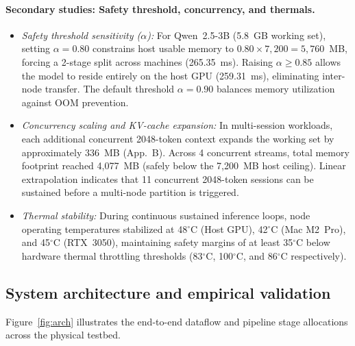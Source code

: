 \documentclass[10pt,a4paper]{article}
\begin{document}
\paragraph{Secondary studies: Safety threshold, concurrency, and thermals.}
\begin{itemize}[leftmargin=*]
\item \emph{Safety threshold sensitivity ($\alpha$):} For Qwen~2.5-3B (5.8~GB working set), setting $\alpha=0.80$ constrains host usable memory to $0.80 \times 7{,}200 = 5{,}760$~MB, forcing a 2-stage split across machines (265.35~ms). Raising $\alpha \ge 0.85$ allows the model to reside entirely on the host GPU (259.31~ms), eliminating inter-node transfer. The default threshold $\alpha=0.90$ balances memory utilization against OOM prevention.
\item \emph{Concurrency scaling and KV-cache expansion:} In multi-session workloads, each additional concurrent 2048-token context expands the working set by approximately 336~MB (App.~B). Across 4 concurrent streams, total memory footprint reached 4{,}077~MB (safely below the 7{,}200~MB host ceiling). Linear extrapolation indicates that 11 concurrent 2048-token sessions can be sustained before a multi-node partition is triggered.
\item \emph{Thermal stability:} During continuous sustained inference loops, node operating temperatures stabilized at 48$^\circ$C (Host GPU), 42$^\circ$C (Mac M2~Pro), and 45$^\circ$C (RTX~3050), maintaining safety margins of at least 35$^\circ$C below hardware thermal throttling thresholds (83$^\circ$C, 100$^\circ$C, and 86$^\circ$C respectively).
\end{itemize}

\subsection{System architecture and empirical validation}
Figure~\ref{fig:arch} illustrates the end-to-end dataflow and pipeline stage allocations across the physical testbed.
\end{document}
